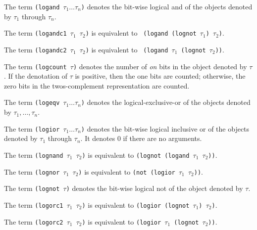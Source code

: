 {The term {\tt (logand $\tau_1 \ldots \tau_n$)} denotes the bit-wise
logical and of the objects denoted by $\tau_1$ through $\tau_n$.}



{The term {\tt (logandc1 $\tau_1$ $\tau_2$)} is equivalent to {\tt
(logand (lognot $\tau_1$) $\tau_2$)}.}



{The term {\tt (logandc2 $\tau_1$ $\tau_2$)} is equivalent to {\tt
(logand $\tau_1$ (lognot $\tau_2$))}.}



{The term {\tt (logcount $\tau$)} denotes the number of {\it on} bits in the object denoted
by $\tau$. If the denotation of $\tau$ is positive, then the one bits are counted;
otherwise, the zero bits in the twos-complement representation are counted.}



{The term {\tt (logeqv $\tau_1 \ldots \tau_n$)} denotes the logical-exclusive-or of the
objects denoted by $\tau_1,\ldots,\tau_n$.}



{The term {\tt (logior $\tau_1 \ldots \tau_n$)} denotes the bit-wise logical inclusive or of the
objects denoted by $\tau_1$ through $\tau_n$. It denotes 0 if there are no arguments.}



{The term {\tt (lognand $\tau_1$ $\tau_2$)} is equivalent to {\tt (lognot
(logand $\tau_1$ $\tau_2$))}.}



{The term {\tt (lognor $\tau_1$ $\tau_2$)} is equivalent to {\tt (not (logior $\tau_1$
$\tau_2$))}.}


{The term {\tt (lognot $\tau$)} denotes the bit-wise logical not of the object denoted by $\tau$.}



{The term {\tt (logorc1 $\tau_1$ $\tau_2$)} is equivalent to {\tt (logior (lognot
$\tau_1$) $\tau_2$)}.}



{The term {\tt (logorc2 $\tau_1$ $\tau_2$)} is equivalent to {\tt (logior
$\tau_1$ (lognot $\tau_2$))}.}




